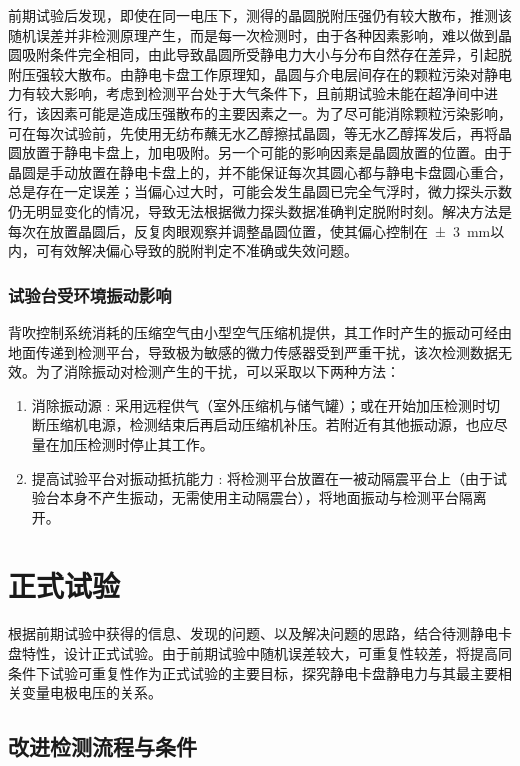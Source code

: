 前期试验后发现，即使在同一电压下，测得的晶圆脱附压强仍有较大散布，推测该随机误差并非检测原理产生，而是每一次检测时，由于各种因素影响，难以做到晶圆吸附条件完全相同，由此导致晶圆所受静电力大小与分布自然存在差异，引起脱附压强较大散布。由静电卡盘工作原理知，晶圆与介电层间存在的颗粒污染对静电力有较大影响，考虑到检测平台处于大气条件下，且前期试验未能在超净间中进行，该因素可能是造成压强散布的主要因素之一。为了尽可能消除颗粒污染影响，可在每次试验前，先使用无纺布蘸无水乙醇擦拭晶圆，等无水乙醇挥发后，再将晶圆放置于静电卡盘上，加电吸附。另一个可能的影响因素是晶圆放置的位置。由于晶圆是手动放置在静电卡盘上的，并不能保证每次其圆心都与静电卡盘圆心重合，总是存在一定误差；当偏心过大时，可能会发生晶圆已完全气浮时，微力探头示数仍无明显变化的情况，导致无法根据微力探头数据准确判定脱附时刻。解决方法是每次在放置晶圆后，反复肉眼观察并调整晶圆位置，使其偏心控制在\SI{\pm 3}{\mm}以内，可有效解决偏心导致的脱附判定不准确或失效问题。

\subsubsection{试验台受环境振动影响}\label{sec:exp-pilot-fix-vib}

背吹控制系统消耗的压缩空气由小型空气压缩机提供，其工作时产生的振动可经由地面传递到检测平台，导致极为敏感的微力传感器受到严重干扰，该次检测数据无效。为了消除振动对检测产生的干扰，可以采取以下两种方法：

\begin{enumerate}
  \item 消除振动源 :
    采用远程供气（室外压缩机与储气罐）；或在开始加压检测时切断压缩机电源，检测结束后再启动压缩机补压。若附近有其他振动源，也应尽量在加压检测时停止其工作。
  \item 提高试验平台对振动抵抗能力 :
    将检测平台放置在一被动隔震平台上（由于试验台本身不产生振动，无需使用主动隔震台），将地面振动与检测平台隔离开。
\end{enumerate}



\section{正式试验}\label{sec:exp-main}

根据前期试验中获得的信息、发现的问题、以及解决问题的思路，结合待测静电卡盘特性，设计正式试验。由于前期试验中随机误差较大，可重复性较差，将提高同条件下试验可重复性作为正式试验的主要目标，探究静电卡盘静电力与其最主要相关变量电极电压的关系。


\subsection{改进检测流程与条件}\label{sec:exp-main-proc}

